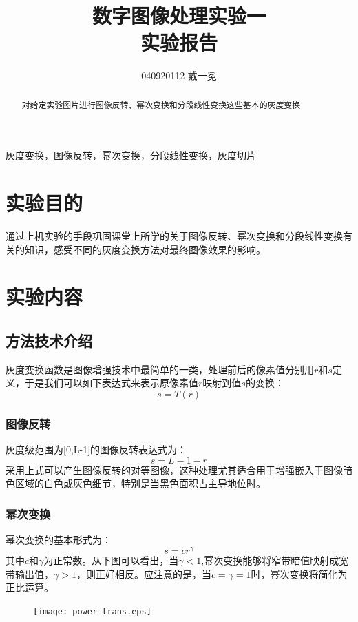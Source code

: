 \documentclass[]{IEEEphot}
\begin{document}
\title{数字图像处理实验一\\实验报告}
\author{040920112 戴一冕}
\maketitle
{}
\begin{abstract}
  对给定实验图片进行图像反转、幂次变换和分段线性变换这些基本的灰度变换
\end{abstract}
\begin{IEEEkeywords}
	灰度变换，图像反转，幂次变换，分段线性变换，灰度切片
\end{IEEEkeywords}
\section{实验目的}
通过上机实验的手段巩固课堂上所学的关于图像反转、幂次变换和分段线性变换有关的知识，感受不同的灰度变换方法对最终图像效果的影响。
\section{实验内容}
\subsection{方法技术介绍}
灰度变换函数是图像增强技术中最简单的一类，处理前后的像素值分别用$r$和$s$定义，于是我们可以如下表达式来表示原像素值$r$映射到值$s$的变换：
\begin{equation}
	s = T(r)
	\label{eql}
\end{equation}
\subsubsection{图像反转}
灰度级范围为[0,L-1]的图像反转表达式为： 
\begin{equation}
	s = L-1-r
	\label{eql}
\end{equation}
采用上式可以产生图像反转的对等图像，这种处理尤其适合用于增强嵌入于图像暗色区域的白色或灰色细节，特别是当黑色面积占主导地位时。
\subsubsection{幂次变换}
幂次变换的基本形式为：
\begin{equation}
	s = cr^{\gamma}
	\label{eql}
\end{equation}
其中$c$和$\gamma$为正常数。从下图可以看出，当${\gamma}<{1}$,幂次变换能够将窄带暗值映射成宽带输出值，${\gamma}>{1}$，则正好相反。应注意的是，当$c={\gamma}=1$时，幂次变换将简化为正比运算。
\begin{figure}[h]
\centering
\texttt{[image: power\_trans.eps]}\\
\label{fig_envl}
\end{figure}
\end{document}
